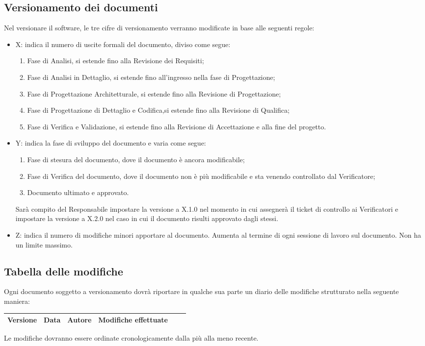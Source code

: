 \subsection{Versionamento dei documenti}
\label{6.3}
Nel versionare il software, le tre cifre di versionamento verranno modificate in base alle seguenti regole:
\begin{itemize}
\item X: indica il numero di uscite formali del documento, diviso come segue:
	\begin{enumerate}
	\item Fase di Analisi, si estende fino alla Revisione dei Requisiti;
	\item Fase di Analisi in Dettaglio, si estende fino all'ingresso nella fase di Progettazione;
	\item Fase di Progettazione Architetturale, si estende fino alla Revisione di Progettazione;
	\item Fase di Progettazione di Dettaglio e Codifica,si estende fino alla Revisione di Qualifica;
	\item Fase di Verifica e Validazione, si estende fino alla Revisione di Accettazione e alla fine del progetto.
	\end{enumerate}
\item Y: indica la fase di sviluppo del documento e varia come segue:
	\begin{enumerate}[start=0]
	\item Fase di stesura del documento, dove il documento è ancora modificabile;
	\item Fase di Verifica del documento, dove il documento non è più modificabile e sta venendo controllato dal Verificatore;
	\item Documento ultimato e approvato.
	\end{enumerate}
Sarà compito del Responsabile impostare la versione a X.1.0 nel momento in cui assegnerà il ticket di controllo ai Verificatori e impostare la versione a X.2.0 nel caso in cui il documento risulti approvato dagli stessi.
\item Z: indica il numero di modifiche minori apportare al documento. Aumenta al termine di ogni sessione di lavoro sul documento. Non ha un limite massimo.
\end{itemize}

\subsection{Tabella delle modifiche}
\label{6.4}
Ogni documento soggetto a versionamento dovrà riportare in qualche sua parte un diario delle modifiche strutturato nella seguente maniera:
\begin{center}
\begin{longtable}{|c|c|c|p{0.5\linewidth}|}
\toprule
\textbf{Versione} & \textbf{Data} & \textbf{Autore} & \textbf{Modifiche effettuate}\\

\bottomrule
\end{longtable}
\end{center}
Le modifiche dovranno essere ordinate cronologicamente dalla più alla meno recente.

